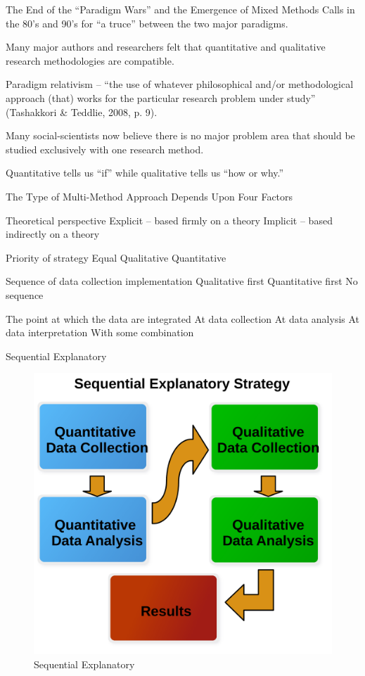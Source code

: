 The End of the “Paradigm Wars” and the Emergence of Mixed Methods
Calls in the 80's and 90's for ``a truce'' between the two major paradigms.

Many major authors and researchers felt that quantitative and qualitative research methodologies are compatible.

Paradigm relativism – ``the use of whatever philosophical and/or methodological approach (that) works for the particular research problem under study'' (Tashakkori \& Teddlie, 2008, p. 9).

Many social-scientists now believe there is no major problem area that should be studied exclusively with one research method.

Quantitative tells us ``if'' while qualitative tells us ``how or why.''

The Type of Multi-Method Approach Depends Upon Four Factors

Theoretical perspective
	Explicit – based firmly on a theory
	Implicit – based indirectly on a theory

Priority of strategy
	Equal
	Qualitative
	Quantitative

Sequence of data collection implementation
	Qualitative first
	Quantitative first
	No sequence

The point at which the data are integrated
	At data collection
	At data analysis
	At data interpretation
	With some combination

Sequential Explanatory

\begin{figure}[H]
	\centering
	\includegraphics[width=\maxwidth{.95\linewidth}]{gfx/14-Seq_Explain}
	\caption{Sequential Explanatory}
	\label{14:fig90}
\end{figure}

